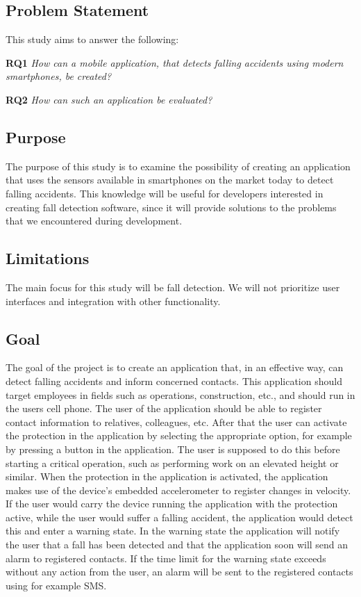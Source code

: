 \documentclass[12pt, a4paper, onecolumn]{article}
\begin{document}
	\subsection{Problem Statement}
	
	This study aims to answer the following:
	
	\textbf{RQ1} \textit{How can a mobile application, that detects falling accidents using modern smartphones, be created?}
	
	\textbf{RQ2} \textit{How can such an application be evaluated?}
	
	
	\subsection{Purpose}
	
	The purpose of this study is to examine the possibility of creating an application that uses the sensors available in smartphones on the market today to detect falling accidents. This knowledge will be useful for developers interested in creating fall detection software, since it will provide solutions to the problems that we encountered during development.
	
	\subsection{Limitations}
	
	The main focus for this study will be fall detection. We will not prioritize user interfaces and integration with other functionality.
	
	\subsection{Goal}
	
	The goal of the project is to create an application that, in an effective way, can detect falling accidents and inform concerned contacts. This application should target employees in fields such as operations, construction, etc., and should run in the users cell phone. The user of the application should be able to register contact information to relatives, colleagues, etc. After that the user can activate the protection in the application by selecting the appropriate option, for example by pressing a button in the application. The user is supposed to do this before starting a critical operation, such as performing work on an elevated height or similar. When the protection in the application is activated, the application makes use of the device's embedded accelerometer to register changes in velocity. If the user would carry the device running the application with the protection active, while the user would suffer a falling accident, the application would detect this and enter a warning state. In the warning state the application will notify the user that a fall has been detected and that the application soon will send an alarm to registered contacts. If the time limit for the warning state exceeds without any action from the user, an alarm will be sent to the registered contacts using for example SMS.
	
\end{document}
